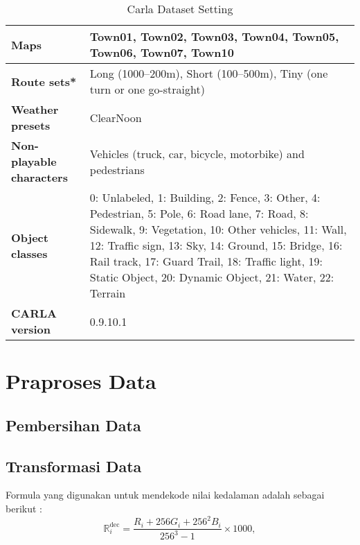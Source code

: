 \begin{table}[H]
\centering
\caption{Carla Dataset Setting}
\label{tab:carla_dataset_setting}
\begin{tabularx}{\textwidth}{lX}
\hline
\textbf{Maps} & Town01, Town02, Town03, Town04, Town05, Town06, Town07, Town10 \\
\hline
\textbf{Route sets*} & 
Long (1000--200m), Short (100--500m), Tiny (one turn or one go-straight) \\
\hline
\textbf{Weather presets} & ClearNoon \\
\hline
\textbf{Non-playable characters} & Vehicles (truck, car, bicycle, motorbike) and pedestrians \\
\hline
\textbf{Object classes} & 
0: Unlabeled, 1: Building, 2: Fence, 3: Other, 4: Pedestrian, 5: Pole, 6: Road lane, 7: Road, 8: Sidewalk, 9: Vegetation, 10: Other vehicles, 11: Wall, 12: Traffic sign, 13: Sky, 14: Ground, 15: Bridge, 16: Rail track, 17: Guard Trail, 18: Traffic light, 19: Static Object, 20: Dynamic Object, 21: Water, 22: Terrain \\
\hline
\textbf{CARLA version} & 0.9.10.1 \\
\hline
\end{tabularx}
\end{table}
\section{Praproses Data}
\subsection{Pembersihan Data}
\subsection{Transformasi Data}

        Formula yang digunakan untuk mendekode nilai kedalaman adalah sebagai berikut \parencite{carladepthcamera}:
        \begin{equation}
            \mathbb{R}_i^{\text{dec}} = \frac{R_i + 256 G_i + 256^2 B_i}{256^3 - 1} \times 1000,
            \end{equation}
      


